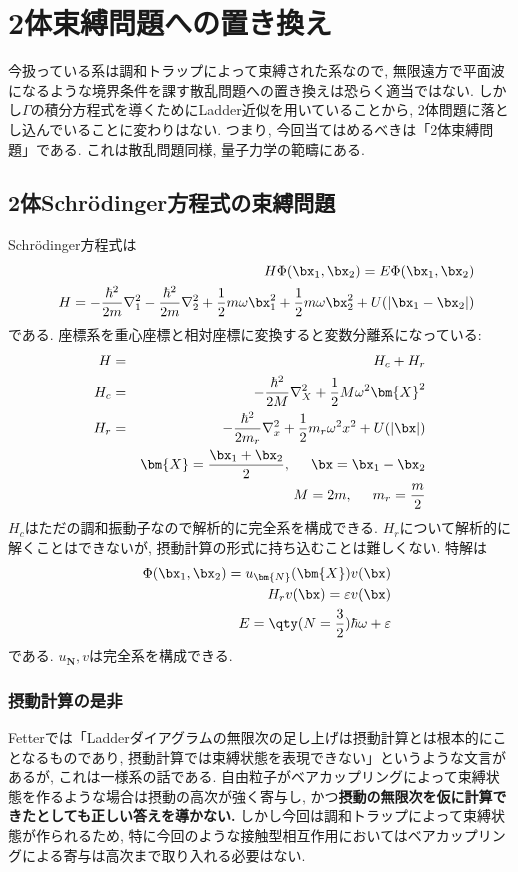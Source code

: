 \documentclass[10.5pt,a4paper]{jreport}
\begin{document}
\section{2体束縛問題への置き換え}
今扱っている系は調和トラップによって束縛された系なので, 無限遠方で平面波になるような境界条件を課す散乱問題への置き換えは恐らく適当ではない. しかし$\Gamma$の積分方程式を導くためにLadder近似を用いていることから, 2体問題に落とし込んでいることに変わりはない. つまり, 今回当てはめるべきは「2体束縛問題」である. これは散乱問題同様, 量子力学の範疇にある.
\subsection{2体Schr\"odinger方程式の束縛問題}
Schr\"odinger方程式は
\begin{eqnarray}
  \nonumber &&H\Phi(\bx_1, \bx_2) = E\Phi(\bx_1, \bx_2)\\
  &&H = -\frac{\hbar^2}{2m}\nabla_1^2 -\frac{\hbar^2}{2m}\nabla_2^2 + \frac12m\omega\bx_1^2 + \frac12m\omega\bx_2^2 + U(|\bx_1 - \bx_2|)
\end{eqnarray}
である. 座標系を重心座標と相対座標に変換すると変数分離系になっている:
\begin{eqnarray}
  \nonumber H &=& H_c + H_r\\
  \nonumber H_c &=& -\frac{\hbar^2}{2M}\nabla_X^2 + \frac12M\omega^2 \bm{X}^2\\
  \nonumber H_r &=& -\frac{\hbar^2}{2m_r}\nabla_x^2 + \frac12m_r\omega^2 x^2 + U(|\bx|)\\
  \nonumber && \bm{X} = \frac{\bx_1 + \bx_2}{2}, \hspace{0.5cm}\bx = \bx_1 - \bx_2\\
  &&M = 2m, \hspace{0.5cm}m_r = \frac{m}{2}
\end{eqnarray}
$H_c$はただの調和振動子なので解析的に完全系を構成できる. $H_r$について解析的に解くことはできないが, 摂動計算の形式に持ち込むことは難しくない. 特解は
\begin{eqnarray}
  &&\Phi(\bx_1, \bx_2) = u_{\bm{N}}(\bm{X})v(\bx)\\
  &&H_rv(\bx) = \varepsilon v(\bx)\\
  &&E = \qty(N = \frac32)\hbar\omega + \varepsilon
\end{eqnarray}
である. $u_{\bm{N}}, v$は完全系を構成できる.

\subsubsection{摂動計算の是非}
Fetterでは「Ladderダイアグラムの無限次の足し上げは摂動計算とは根本的にことなるものであり, 摂動計算では束縛状態を表現できない」というような文言があるが, これは一様系の話である. 自由粒子がベアカップリングによって束縛状態を作るような場合は摂動の高次が強く寄与し, かつ\textbf{摂動の無限次を仮に計算できたとしても正しい答えを導かない.} しかし今回は調和トラップによって束縛状態が作られるため, 特に今回のような接触型相互作用においてはベアカップリングによる寄与は高次まで取り入れる必要はない.
\end{document}
